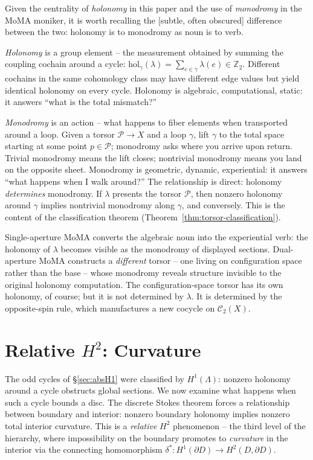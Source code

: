 \documentclass[11pt]{amsart}  %
\theoremstyle{plain}
\theoremstyle{definition}
\theoremstyle{remark}
\newcommand{\style}[1]{{\em #1}} %
\newcommand{\torsor}{\mathcal{P}} %
\newcommand{\connecting}{\delta^*} %
\newcommand{\Z}{\mathbb{Z}} %
\newcommand{\cgraph}{\Lambda} %
\newcommand{\coupling}{\lambda} %
\newcommand{\conf}{\mathcal{C}} %
\begin{document}
Given the centrality of {\em holonomy} in this paper and the use of {\em monodromy} in the MoMA moniker, it is worth recalling the [subtle, often obscured] difference between the two: holonomy is to monodromy as noun is to verb.

\style{Holonomy} is a group element -- the measurement obtained by summing the coupling cochain around a cycle: $\mathrm{hol}_\gamma(\coupling) = \sum_{e \in \gamma} \coupling(e) \in \Z_2$. Different cochains in the same cohomology class may have different edge values but yield identical holonomy on every cycle. Holonomy is algebraic, computational, static: it answers ``what is the total mismatch?''

\style{Monodromy} is an action -- what happens to fiber elements when transported around a loop. Given a torsor $\torsor \to X$ and a loop $\gamma$, lift $\gamma$ to the total space starting at some point $p \in \torsor$; monodromy asks where you arrive upon return. Trivial monodromy means the lift closes; nontrivial monodromy means you land on the opposite sheet. Monodromy is geometric, dynamic, experiential: it answers ``what happens when I walk around?''
%
The relationship is direct: holonomy \emph{determines} monodromy. If $\coupling$ presents the torsor $\torsor$, then nonzero holonomy around $\gamma$ implies nontrivial monodromy along $\gamma$, and conversely. This is the content of the classification theorem (Theorem~\ref{thm:torsor-classification}).

Single-aperture MoMA converts the algebraic noun into the experiential verb: the holonomy of $\coupling$ becomes visible as the monodromy of displayed sections. Dual-aperture MoMA constructs a \emph{different} torsor -- one living on configuration space rather than the base -- whose monodromy reveals structure invisible to the original holonomy computation. The configuration-space torsor has its own holonomy, of course; but it is not determined by $\coupling$. It is determined by the opposite-spin rule, which manufactures a new cocycle on $\conf_2(X)$.

\section{Relative $H^2$: Curvature}
\label{sec:relH2}

The odd cycles of \S\ref{sec:absH1} were classified by $H^1(\cgraph)$: nonzero holonomy around a cycle obstructs global sections. We now examine what happens when such a cycle bounds a disc. The discrete Stokes theorem forces a relationship between boundary and interior: nonzero boundary holonomy implies nonzero total interior curvature. This is a \style{relative} $H^2$ phenomenon -- the third level of the hierarchy, where impossibility on the boundary promotes to \style{curvature} in the interior via the connecting homomorphism $\connecting: H^1(\partial D) \to H^2(D, \partial D)$.
\end{document}
